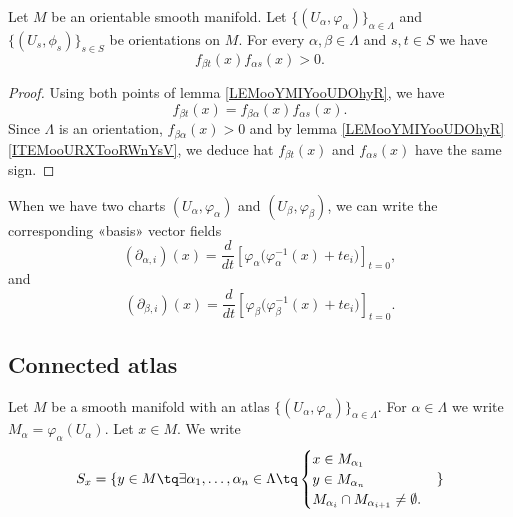 \begin{lemma}		\label{LEMooXMIJooCRspfz}
	Let \( M\) be an orientable smooth manifold. Let \( \{ (U_{\alpha}, \varphi_{\alpha}) \}_{\alpha\in \Lambda}\) and \( \{ (U_s,\phi_s) \}_{s\in S}\) be orientations on \( M\). For every \( \alpha,\beta\in \Lambda\) and \( s,t\in S\) we have
	\begin{equation}
		f_{\beta t}(x)f_{\alpha s}(x)>0.
	\end{equation}
\end{lemma}

\begin{proof}
	Using both points of lemma \ref{LEMooYMIYooUDOhyR}, we have
	\begin{equation}
		f_{\beta t}(x)=f_{\beta \alpha}(x)f_{\alpha s}(x).
	\end{equation}
	Since \( \Lambda\) is an orientation, \( f_{\beta\alpha}(x)>0\) and by lemma \ref{LEMooYMIYooUDOhyR}\ref{ITEMooURXTooRWnYsV}, we deduce hat \( f_{\beta t}(x)\) and \( f_{\alpha s}(x)\) have the same sign.
\end{proof}


\begin{normaltext}		\label{NORMooPXHIooHTFJoa}
	When we have two charts \( (U_{\alpha},\varphi_{\alpha})\) and \( (U_{\beta},\varphi_{\beta})\), we can write the corresponding «basis» vector fields
	\begin{equation}
		(\partial_{\alpha, i})(x)=\frac{d}{dt} \left[ \varphi_{\alpha}\big( \varphi_{\alpha}^{-1}(x)+te_i \big)  \right]_{t=0},
	\end{equation}
	and
	\begin{equation}
		(\partial_{\beta, i})(x)=\frac{d}{dt} \left[ \varphi_{\beta}\big( \varphi_{\beta}^{-1}(x)+te_i \big)  \right]_{t=0}.
	\end{equation}
\end{normaltext}

\subsection{Connected atlas}

\begin{definition}		\label{DEFooIQUXooOdVpLS}
	Let \( M\) be a smooth manifold with an atlas \( \{ (U_{\alpha}, \varphi_{\alpha}) \}_{\alpha\in \Lambda}\). For \( \alpha\in \Lambda\) we write \( M_{\alpha}=\varphi_{\alpha}(U_{\alpha})\). Let \( x\in M\). We write
	\begin{equation}
		S_x=\{ y\in M \tq \exists \alpha_1,\ldots,\alpha_n\in\Lambda\tq
		\begin{cases}
			x\in M_{\alpha_1} \\
			y\in M_{\alpha_n} \\
			M_{\alpha_i}\cap M_{\alpha_{i+1}}\neq \emptyset.
		\end{cases}
		\}
	\end{equation}
\end{definition}

